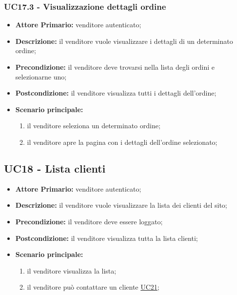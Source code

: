 \subsubsection{UC17.3 - Visualizzazione dettagli ordine}
\label{UC17.3}
\begin{itemize}
    \item \textbf{Attore Primario:} venditore autenticato;
    \item \textbf{Descrizione:} il venditore vuole visualizzare i dettagli di un determinato ordine;
    \item \textbf{Precondizione:} il venditore deve trovarsi nella lista degli ordini e selezionarne uno;
    \item \textbf{Postcondizione:} il venditore visualizza tutti i dettagli dell'ordine;
    \item \textbf{Scenario principale:}
    \begin{enumerate}
        \item il venditore seleziona un determinato ordine;
        \item il venditore apre la pagina con i dettagli dell'ordine selezionato;
    \end{enumerate}
\end{itemize}

\subsection{UC18 - Lista clienti}
\label{UC18}
\begin{itemize}
    \item \textbf{Attore Primario:} venditore autenticato;
    \item \textbf{Descrizione:} il venditore vuole visualizzare la lista dei clienti del sito;
    \item \textbf{Precondizione:} il venditore deve essere loggato;
    \item \textbf{Postcondizione:} il venditore visualizza tutta la lista clienti;
    \item \textbf{Scenario principale:}
    \begin{enumerate}
        \item il venditore visualizza la lista;
         \item il venditore può contattare un cliente \hyperref[UC12]{UC21};
    \end{enumerate}
\end{itemize}

